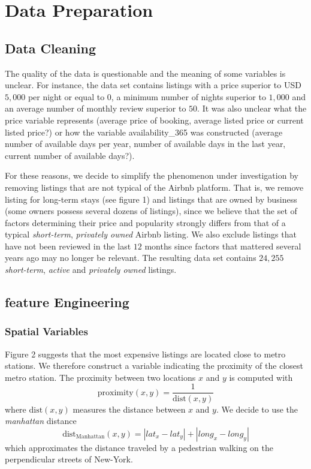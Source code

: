 \documentclass{article}
\begin{document}
	
\section{Data Preparation}
\subsection{Data Cleaning}

The quality of the data is questionable and the meaning of some variables is unclear. For instance, the data set contains listings with a price superior to USD$5,000$ per night or equal to $0$, a minimum number of nights superior to $1,000$ and an average number of monthly review superior to $50$. It was also unclear what the price variable represents (average price of booking, average listed price or current listed price?) or how the variable availability\_365 was constructed (average number of available days per year, number of available days in the last year, current number of available days?).

For these reasons, we decide to simplify the phenomenon under investigation by removing listings that are not typical of the Airbnb platform. That is, we remove listing for long-term stays (see figure 1) and listings that are owned by business (some owners possess several dozens of listings), since we believe that the set of factors determining their price and popularity strongly differs from that of a typical \textit{short-term}, \textit{privately owned} Airbnb listing. We also exclude listings that have not been reviewed in the last $12$ months since factors that mattered several years ago may no longer be relevant. The resulting data set contains $24,255$ \textit{short-term}, \textit{active} and \textit{privately owned} listings.



\subsection{feature Engineering}
\subsubsection{Spatial Variables}
Figure 2 suggests that the most expensive listings are located close to metro stations. We therefore construct a variable indicating the proximity of the closest metro station. The proximity between two locations $x$ and $y$ is computed with
$$\text{proximity}(x,y) = \dfrac{1}{\text{dist}(x,y)}$$
where $\text{dist}(x,y)$ measures the distance between $x$ and $y$. We decide to use the \textit{manhattan} distance
$$\text{dist}_{\text{Manhattan}}(x,y) = |lat_x - lat_y| + |long_x - long_y|$$
which approximates the distance traveled by a pedestrian walking on the perpendicular streets of New-York.
\end{document}
